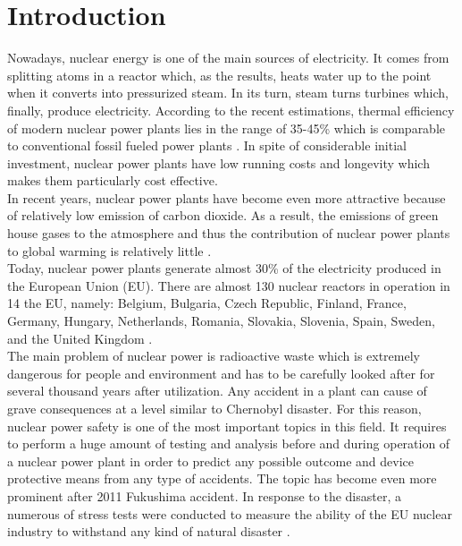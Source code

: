 \chapter{Introduction}\label{chapter:introduction}

Nowadays, nuclear energy is one of the main sources of electricity. It comes from splitting atoms in a reactor which, as the results, heats water up to the point when it converts into pressurized steam. In its turn, steam turns turbines which, finally, produce electricity. According to the recent estimations, thermal efficiency of modern nuclear power plants lies in the range of 35-45\% which is comparable to conventional fossil fueled power plants \cite{intro:efficiency-of-nuclear-power-plants}. In spite of considerable initial investment,  nuclear power plants have low running costs and longevity which makes them particularly cost effective.\\


In recent years, nuclear power plants have become even more attractive because of relatively low emission of carbon dioxide. As a result, the emissions of green house gases to the atmosphere and thus the contribution of nuclear power plants to global warming is relatively little \cite{intro:pros-and-cons-of-nuclear-power}.\\


Today, nuclear power plants generate almost 30\% of the electricity produced in the European Union (EU). There are almost 130 nuclear reactors in operation in 14 the EU, namely: Belgium, Bulgaria, Czech Republic, Finland, France, Germany, Hungary, Netherlands, Romania, Slovakia, Slovenia, Spain, Sweden, and the United Kingdom \cite{intro:eu-nuclear-industry-general}.\\


The main problem of nuclear power is radioactive waste which is extremely dangerous for people and environment and has to be carefully looked after for several thousand years after utilization. Any accident in a plant can cause of grave consequences at a level similar to Chernobyl disaster. For this reason, nuclear power safety is one of the most important topics in this field. It requires to perform a huge amount of testing and analysis before and during operation of a nuclear power plant in order to predict any possible outcome and device protective means from any type of accidents. The topic has become even more prominent after 2011 Fukushima accident. In response to the disaster, a numerous of stress tests were conducted to measure the ability of the EU nuclear industry to withstand any kind of natural disaster \cite{intro:eu-nuclear-industry-general}.\\



